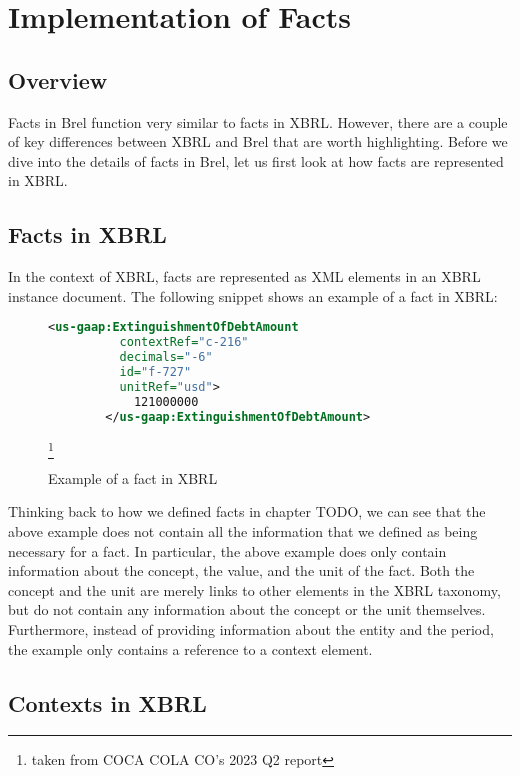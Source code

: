 \section{Implementation of Facts}

\subsection{Overview}

Facts in Brel function very similar to facts in XBRL. 
However, there are a couple of key differences between XBRL and Brel that are worth highlighting.
Before we dive into the details of facts in Brel, let us first look at how facts are represented in XBRL.

\subsection{Facts in XBRL}

In the context of XBRL, facts are represented as XML elements in an XBRL instance document. 
The following snippet shows an example of a fact in XBRL:

\begin{figure}[H]
    \caption{Example of a fact in XBRL}
    \label{fig:example_fact_xbrl}
    \begin{lstlisting}[language=XML]
        <us-gaap:ExtinguishmentOfDebtAmount 
          contextRef="c-216" 
          decimals="-6" 
          id="f-727" 
          unitRef="usd">
            121000000
        </us-gaap:ExtinguishmentOfDebtAmount>
    \end{lstlisting}\footnote[1]{taken from COCA COLA CO's 2023 Q2 report}
\end{figure}


Thinking back to how we defined facts in chapter TODO,
we can see that the above example does not contain all the information that we defined as being necessary for a fact.
In particular, the above example does only contain information about the concept, the value, and the unit of the fact.
Both the concept and the unit are merely links to other elements in the XBRL taxonomy, but do not contain any information about the concept or the unit themselves.
Furthermore, instead of providing information about the entity and the period, the example only contains a reference to a context element. 

\subsection{Contexts in XBRL}

